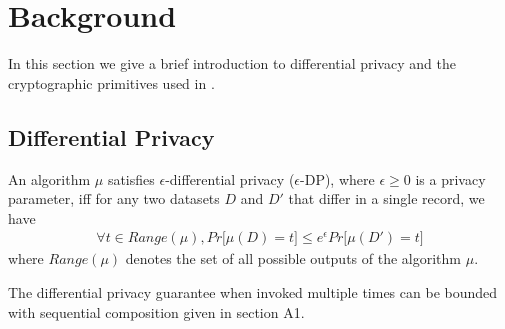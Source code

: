 
\section{Background}
In this section we give a brief introduction to differential privacy and the cryptographic primitives used in \system. 

\subsection{Differential Privacy}
\begin{definition} An algorithm $\mu$
satisfies $\epsilon$-differential privacy ($\epsilon$-DP), where $\epsilon \geq 0$ is a privacy parameter, iff
 for any two datasets $D$ and $D'$ that differ in a single record, we have
\begin{gather}
\forall t \in Range(\mu), Pr \big[\mu(D) = t\big] \leq e^{\epsilon}Pr\big[\mu(D') = t\big]
\end{gather}
where $Range(\mu)$ denotes the set of all possible outputs
of the algorithm $\mu$.
\end{definition} 
The differential privacy guarantee  when
invoked multiple times can
be bounded with sequential composition given in section A1.

